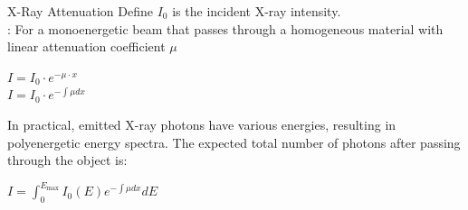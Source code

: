 \begin{frame}{X-Ray Attenuation}
    Define $I_0$ is the incident X-ray intensity. \\
    \vskip12pt
    : For a monoenergetic beam that passes through a homogeneous material with linear attenuation coefficient  $\mu$\\
    \begin{center}
        \vskip6pt
        $I=I_0\cdot e^{-\mu\cdot x}$\\
        $I=I_0\cdot e^{-\int\mu dx}$
    \end{center}

    In practical, emitted X-ray photons have various energies, resulting in polyenergetic energy spectra.
    The expected total number of photons after passing through the object is:
    \begin{center}
        $I = \int_{0}^{E_{\text{max}}}I_0(E) e^{ -\int{\mu dx} }dE$
    \end{center}

\end{frame}


